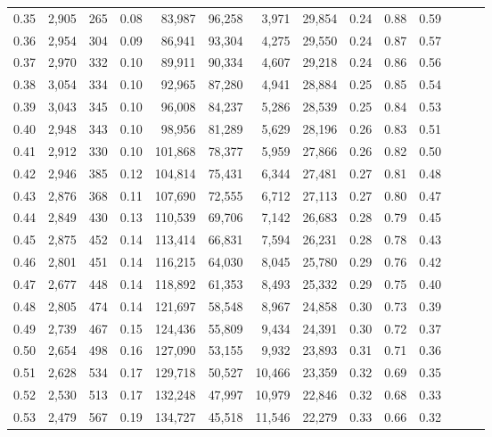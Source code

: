 \begin{tabular}{rrrrrrrrrrrrrr}
0.35 &  2,905 &    265 &  0.08 &   83,987 &   96,258 &   3,971 &  29,854 &  0.24 &  0.88 &      0.59 \\
0.36 &  2,954 &    304 &  0.09 &   86,941 &   93,304 &   4,275 &  29,550 &  0.24 &  0.87 &      0.57 \\
0.37 &  2,970 &    332 &  0.10 &   89,911 &   90,334 &   4,607 &  29,218 &  0.24 &  0.86 &      0.56 \\
0.38 &  3,054 &    334 &  0.10 &   92,965 &   87,280 &   4,941 &  28,884 &  0.25 &  0.85 &      0.54 \\
0.39 &  3,043 &    345 &  0.10 &   96,008 &   84,237 &   5,286 &  28,539 &  0.25 &  0.84 &      0.53 \\
0.40 &  2,948 &    343 &  0.10 &   98,956 &   81,289 &   5,629 &  28,196 &  0.26 &  0.83 &      0.51 \\
0.41 &  2,912 &    330 &  0.10 &  101,868 &   78,377 &   5,959 &  27,866 &  0.26 &  0.82 &      0.50 \\
0.42 &  2,946 &    385 &  0.12 &  104,814 &   75,431 &   6,344 &  27,481 &  0.27 &  0.81 &      0.48 \\
0.43 &  2,876 &    368 &  0.11 &  107,690 &   72,555 &   6,712 &  27,113 &  0.27 &  0.80 &      0.47 \\
0.44 &  2,849 &    430 &  0.13 &  110,539 &   69,706 &   7,142 &  26,683 &  0.28 &  0.79 &      0.45 \\
0.45 &  2,875 &    452 &  0.14 &  113,414 &   66,831 &   7,594 &  26,231 &  0.28 &  0.78 &      0.43 \\
0.46 &  2,801 &    451 &  0.14 &  116,215 &   64,030 &   8,045 &  25,780 &  0.29 &  0.76 &      0.42 \\
0.47 &  2,677 &    448 &  0.14 &  118,892 &   61,353 &   8,493 &  25,332 &  0.29 &  0.75 &      0.40 \\
0.48 &  2,805 &    474 &  0.14 &  121,697 &   58,548 &   8,967 &  24,858 &  0.30 &  0.73 &      0.39 \\
0.49 &  2,739 &    467 &  0.15 &  124,436 &   55,809 &   9,434 &  24,391 &  0.30 &  0.72 &      0.37 \\
0.50 &  2,654 &    498 &  0.16 &  127,090 &   53,155 &   9,932 &  23,893 &  0.31 &  0.71 &      0.36 \\
0.51 &  2,628 &    534 &  0.17 &  129,718 &   50,527 &  10,466 &  23,359 &  0.32 &  0.69 &      0.35 \\
0.52 &  2,530 &    513 &  0.17 &  132,248 &   47,997 &  10,979 &  22,846 &  0.32 &  0.68 &      0.33 \\
0.53 &  2,479 &    567 &  0.19 &  134,727 &   45,518 &  11,546 &  22,279 &  0.33 &  0.66 &      0.32 \\

\end{tabular}
